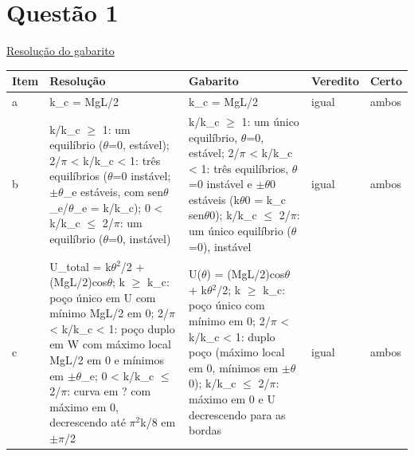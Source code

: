 \documentclass{article}%
\begin{document}
\section*{Questão 1}%
\href{https://poliedroresolve.sistemapoliedro.com.br/vestibulares/ita/2027/ita-2-fase-dia-3-22-10-2026-2-fase-dia-3/dissertativa-1-fisica-2-fase-dia-3-ita-2027}{Resolução do gabarito}\par\smallskip%
\begin{longtable}{@{}p{} p{} p{} p{} p{}@{}}\toprule Item & Resolução & Gabarito & Veredito & Certo \\ \midrule
a & k\_c = MgL/2 & k\_c = MgL/2 & igual & ambos \\
b & k/k\_c $\geq$ 1: um equilíbrio ($\theta$=0, estável); 2/$\pi$ < k/k\_c < 1: três equilíbrios ($\theta$=0 instável; $\pm$$\theta$\_e estáveis, com sen$\theta$\_e/$\theta$\_e = k/k\_c); 0 < k/k\_c $\leq$ 2/$\pi$: um equilíbrio ($\theta$=0, instável) & k/k\_c $\geq$ 1: um único equilíbrio, $\theta$=0, estável; 2/$\pi$ < k/k\_c < 1: três equilíbrios, $\theta$=0 instável e $\pm$$\theta$0 estáveis (k$\theta$0 = k\_c sen$\theta$0); k/k\_c $\leq$ 2/$\pi$: um único equilíbrio ($\theta$=0), instável & igual & ambos \\
c & U\_total = k$\theta$$^2$/2 + (MgL/2)cos$\theta$; k $\geq$ k\_c: poço único em U com mínimo MgL/2 em 0; 2/$\pi$ < k/k\_c < 1: poço duplo em W com máximo local MgL/2 em 0 e mínimos em $\pm$$\theta$\_e; 0 < k/k\_c $\leq$ 2/$\pi$: curva em ? com máximo em 0, decrescendo até $\pi$$^2$k/8 em $\pm$$\pi$/2 & U($\theta$) = (MgL/2)cos$\theta$ + k$\theta$$^2$/2; k $\geq$ k\_c: poço único com mínimo em 0; 2/$\pi$ < k/k\_c < 1: duplo poço (máximo local em 0, mínimos em $\pm$$\theta$0); k/k\_c $\leq$ 2/$\pi$: máximo em 0 e U decrescendo para as bordas & igual & ambos \\
\bottomrule\end{longtable}%
\end{document}

